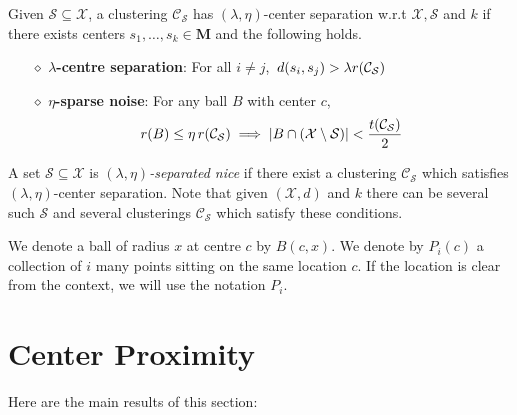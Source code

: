 \documentclass[anon,12pt]{colt2016} %
\newcommand{\mc}{\mathcal}
\newcommand{\mb}{\mathbf}
\begin{document}
\begin{definition}
Given $\mc S \subseteq \mc X$, a clustering $\mc C_{\mc S}$ has $(\lambda, \eta)$-center separation w.r.t $\mc X, \mc S$ and $k$ if there exists centers $s_1, \ldots, s_k \in \mb M$ and the following holds.

\begin{itemize}[nolistsep, noitemsep]
\label{defn:lambdacsnoise}	

\item[$\diamond$] {\bf $\lambda$-centre separation}: For all $i\neq j$, $\thinspace d(s_i, s_j) > \lambda r({\mc C}_{\mc S})$
\item[$\diamond$]{\bf $\eta$-sparse noise}: For any ball $B$ with center $c$, 
\vspace{-0.1in}\begin{align*}
r(B)\leq \eta \thinspace r(\mc{C}_{\mc S}) \implies |B\cap (\mc X\setminus \mc S)| < \frac{t(\mc C_{\mc S})}{2}
\end{align*}
\end{itemize}
\end{definition}

\noindent A set $\mc S \subseteq \mc X$ is {\it $(\lambda, \eta)$-separated nice} if there exist a clustering $\mc C_{\mc S}$ which satisfies $(\lambda, \eta)$-center separation. Note that given $(\mc X, d)$ and $k$ there can be several such $\mc S$ and several clusterings $\mc C_{\mc S}$ which satisfy these conditions.

We denote a ball of radius $x$ at centre $c$ by $B(c, x)$. We denote by $P_{i}(c)$ a collection of $i$ many points sitting on the same location $c$. If the location is clear from the context, we will use the notation $P_i$.

\section{Center Proximity}
\label{section:cp}
Here are the main results of this section:
\end{document}
